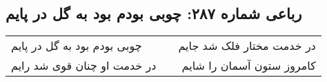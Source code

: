 \begin{center}
\section*{رباعی شماره ۲۸۷: چوبی بودم بود به گل در پایم}
\label{sec:sh287}
\begin{longtable}{l p{0.5cm} r}
چوبی بودم بود به گل در پایم
&&
در خدمت مختار فلک شد جایم
\\
در خدمت او چنان قوی شد رایم
&&
کامروز ستون آسمان را شایم
\\
\end{longtable}
\end{center}
